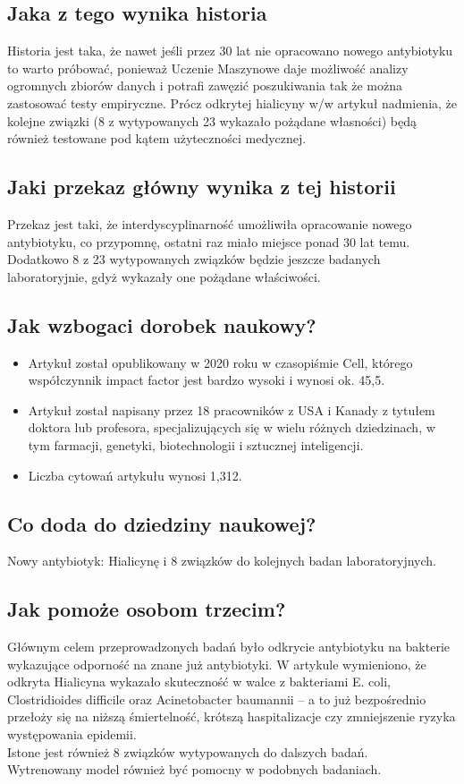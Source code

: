 \subsection{Jaka z tego wynika historia}
Historia jest taka, że nawet jeśli przez 30 lat nie opracowano nowego antybiotyku to warto próbować, ponieważ Uczenie Maszynowe daje możliwość analizy ogromnych zbiorów danych i potrafi zawęzić poszukiwania tak że można zastosować testy empiryczne. Prócz odkrytej hialicyny w/w artykuł nadmienia, że kolejne związki (8 z wytypowanych 23 wykazało pożądane własności) będą również testowane pod kątem użyteczności medycznej.

\subsection{Jaki przekaz główny wynika z tej historii}
Przekaz jest taki, że interdyscyplinarność umożliwiła opracowanie nowego antybiotyku, co przypomnę, ostatni raz miało miejsce ponad 30 lat temu. Dodatkowo 8 z 23 wytypowanych związków będzie jeszcze badanych laboratoryjnie, gdyż wykazały one pożądane właściwości.

\subsection{Jak wzbogaci dorobek naukowy?}
\begin{itemize}
    \item Artykuł został opublikowany w 2020 roku w czasopiśmie Cell, którego współczynnik impact factor jest bardzo wysoki i wynosi ok. 45,5.
    \item Artykuł został napisany przez 18 pracowników z USA i Kanady z tytułem doktora lub profesora, specjalizujących się w wielu różnych dziedzinach, w tym farmacji, genetyki, biotechnologii i sztucznej inteligencji.
    \item Liczba cytowań artykułu wynosi 1,312.
\end{itemize}

\subsection{Co doda do dziedziny naukowej?}
Nowy antybiotyk: Hialicynę i 8 związków do kolejnych badan laboratoryjnych.


\subsection{Jak pomoże osobom trzecim?}
Głównym celem przeprowadzonych badań było odkrycie antybiotyku na bakterie wykazujące odporność na znane już antybiotyki. W artykule wymieniono, że odkryta Hialicyna wykazało skuteczność w walce z bakteriami E. coli, Clostridioides difficile oraz Acinetobacter baumannii – a to już bezpośrednio przełoży się na niższą śmiertelność, krótszą haspitalizacje czy zmniejszenie ryzyka występowania epidemii.\\

Istone jest również 8 związków wytypowanych do dalszych badań.\\

Wytrenowany model również być pomocny w podobnych badaniach.\\

